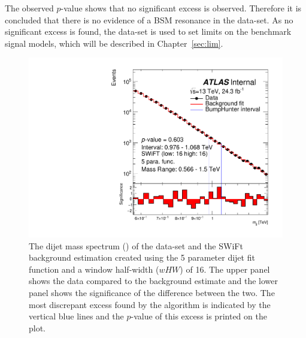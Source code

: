 The observed \bh{} $p$-value shows that no significant excess is observed.
Therefore it is concluded that there is no evidence of a BSM resonance in the \lm{} data-set.
As no significant excess is found, the \lm{} data-set is used to set limits on the benchmark signal models,
which will be described in Chapter~\ref{sec:lim}.

\begin{figure}[!thb]
\captionsetup[subfigure]{aboveskip=0pt,justification=centering}
\centering
  \includegraphics[width=0.7\linewidth, angle=0]{figs/Dibjet/LowMass/FitStudy_min566/bhFit_unblind_5para_low16_high16.pdf}
\vspace{3pt}
\caption[The dijet mass spectrum of the \lm{} data-set and the SWiFt background estimation.
  The most discrepant excess found by the \bh{} algorithm and the \mbox{$p$-value} of this excess are indicated on the plot.]
        {\label{fig:bhFit_lm_unblind}
   The dijet mass spectrum (\mjj) of the \lm{} data-set and the SWiFt background estimation
   created using the 5 parameter dijet fit function and a window half-width ($wHW$) of 16. 
   The upper panel shows the data compared to the background estimate and the lower panel shows the significance of the difference between the two.
   The most discrepant excess found by the \bh{} algorithm is indicated by the vertical blue lines and the \mbox{$p$-value} of this excess is printed on the plot. }
\end{figure}




